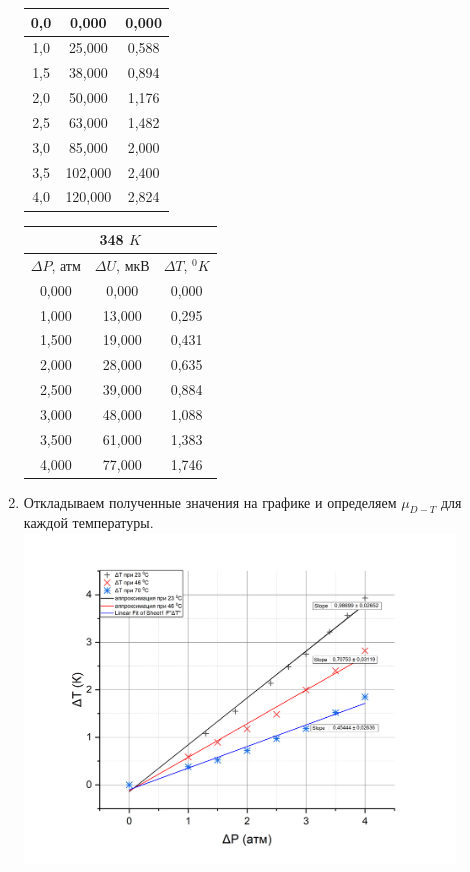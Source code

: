 \documentclass[a4paper, 12pt]{article}%
\begin{document}
\begin{enumerate}
\begin{center}
\begin{tabular}{|c|c|c|}
0,0             & 0,000           & 0,000             \\ \hline
1,0             & 25,000          & 0,588             \\ \hline
1,5             & 38,000          & 0,894             \\ \hline
2,0             & 50,000          & 1,176             \\ \hline
2,5             & 63,000          & 1,482             \\ \hline
3,0             & 85,000          & 2,000             \\ \hline
3,5             & 102,000         & 2,400             \\ \hline
4,0             & 120,000         & 2,824             \\ \hline
\end{tabular}
\begin{tabular}{|c|c|c|}
\hline
\multicolumn{3}{|c|}{348 $K$}                           \\ \hline
$\Delta P$, атм & $\Delta U$, мкВ & $\Delta T$, $^{0}K$ \\ \hline
0,000           & 0,000           & 0,000               \\ \hline
1,000           & 13,000          & 0,295               \\ \hline
1,500           & 19,000          & 0,431               \\ \hline
2,000           & 28,000          & 0,635               \\ \hline
2,500           & 39,000          & 0,884               \\ \hline
3,000           & 48,000          & 1,088               \\ \hline
3,500           & 61,000          & 1,383               \\ \hline
4,000           & 77,000          & 1,746               \\ \hline
\end{tabular}
\end{center}
\newpage
\item Откладываем полученные значения на графике и определяем $\mu_{D-T}$ для каждой температуры.\\
	\includegraphics[width = 0.9\textwidth]{216_2.jpg}

\end{enumerate}
\end{document}
